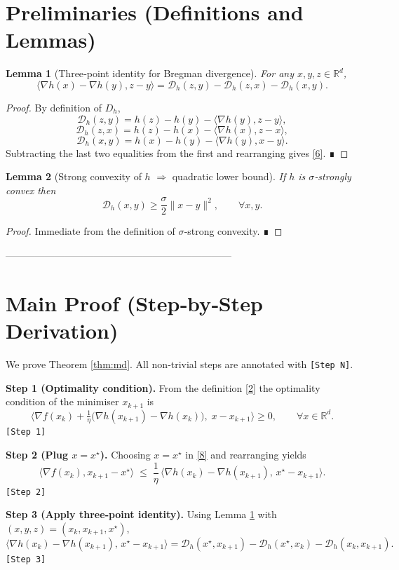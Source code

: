 \documentclass{article}
\newtheorem{lemma}{Lemma}
\newcommand{\D}{\mathcal{D}}
\newcommand{\R}{\mathbb{R}}
\begin{document}
\section*{Preliminaries (Definitions and Lemmas)}
\begin{lemma}[Three‑point identity for Bregman divergence]
\label{lem:3pt}
For any $x,y,z\in\R^{d}$,
\[
\langle\nabla h(x)-\nabla h(y),z-y\rangle
=\D_{h}(z,y)-\D_{h}(z,x)-\D_{h}(x,y).
\tag{6}
\]
\end{lemma}
\begin{proof}
By definition of $D_{h}$,
\[
\D_{h}(z,y)=h(z)-h(y)-\langle\nabla h(y),z-y\rangle,
\]
\[
\D_{h}(z,x)=h(z)-h(x)-\langle\nabla h(x),z-x\rangle,
\]
\[
\D_{h}(x,y)=h(x)-h(y)-\langle\nabla h(y),x-y\rangle.
\]
Subtracting the last two equalities from the first and rearranging
gives \eqref{6}. ∎
\end{proof}

\begin{lemma}[Strong convexity of $h$ $\Rightarrow$ quadratic lower bound]
\label{lem:strong}
If $h$ is $\sigma$‑strongly convex then
\[
\D_{h}(x,y)\ge\frac{\sigma}{2}\|x-y\|^{2},\qquad\forall x,y.
\tag{7}
\]
\end{lemma}
\begin{proof}
Immediate from the definition of $\sigma$‑strong convexity. ∎
\end{proof}

---------------------------------------------------------------------

\section*{Main Proof (Step‑by‑Step Derivation)}
We prove Theorem \ref{thm:md}.  
All non‑trivial steps are annotated with \texttt{[Step N]}.

\bigskip
\noindent\textbf{Step 1 (Optimality condition).}  
From the definition \eqref{2} the optimality condition of the minimiser $x_{k+1}$ is
\[
\big\langle \nabla f(x_{k})+\tfrac{1}{\eta}\big(\nabla h(x_{k+1})-\nabla h(x_{k})\big),\;x-x_{k+1}\big\rangle\ge 0,
\qquad\forall x\in\R^{d}. \tag{8}
\]
\texttt{[Step 1]}

\noindent\textbf{Step 2 (Plug $x=x^{\star}$).}  
Choosing $x=x^{\star}$ in \eqref{8} and rearranging yields
\[
\langle\nabla f(x_{k}),x_{k+1}-x^{\star}\rangle
\;\le\;
\frac{1}{\eta}\,
\langle\nabla h(x_{k})-\nabla h(x_{k+1}),\,x^{\star}-x_{k+1}\rangle .
\tag{9}
\]
\texttt{[Step 2]}

\noindent\textbf{Step 3 (Apply three‑point identity).}  
Using Lemma \ref{lem:3pt} with $(x,y,z)=(x_{k},x_{k+1},x^{\star})$,
\[
\langle\nabla h(x_{k})-\nabla h(x_{k+1}),\,x^{\star}-x_{k+1}\rangle
=
\D_{h}(x^{\star},x_{k+1})-\D_{h}(x^{\star},x_{k})-\D_{h}(x_{k},x_{k+1}). \tag{10}
\]
\texttt{[Step 3]}
\end{document}
